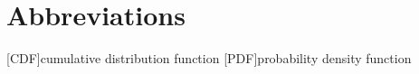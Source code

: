 
\chapter*{Abbreviations}
	\begin{acronym}
		\setlength{\itemsep}{-\parsep}

		[\textup{CDF}]{cumulative distribution function}
		[\textup{PDF}]{probability density function}
	
	\end{acronym}

	
	
